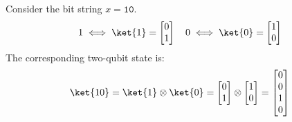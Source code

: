 \begin{examplebox}
    Consider the bit string $x = \texttt{10}$.
    \begin{equation*}
        1 \iff \ket{1} = \begin{bmatrix}
            0 \\
            1
        \end{bmatrix}
        \quad
        0 \iff \ket{0} = \begin{bmatrix}
            1 \\
            0
        \end{bmatrix}
    \end{equation*}
    The corresponding two-qubit state is:
    \begin{equation*}
        \ket{10} = \ket{1} \otimes \ket{0} = \begin{bmatrix}
            0 \\
            1
        \end{bmatrix} \otimes \begin{bmatrix}
            1 \\
            0
        \end{bmatrix} = \begin{bmatrix}
            0 \\
            0 \\
            1 \\
            0
        \end{bmatrix}
    \end{equation*}
\end{examplebox}